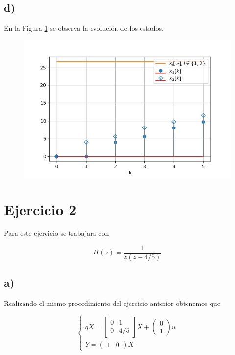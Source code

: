 \documentclass[11pt,a4paper]{article}
\newcommand{\siseq}[1]{ \left\{ \begin{array}{c}
    #1
\end{array} \right. }
\begin{document}
    \subsection*{d)}

    En la Figura \ref{fig:1-d} se observa la evolución de los estados.

    \begin{figure}
        \centering
        \includegraphics[width=.5\textwidth]{Img/1-d.jpg}
        \caption{}
        \label{fig:1-d}
    \end{figure}


    \section*{Ejercicio 2}

    Para este ejercicio se trabajara con 

    \begin{equation}
        H(z) = \frac{1}{z(z-4/5)}
    \end{equation}

    \subsection*{a)}

    Realizando el mismo procedimiento del ejercicio anterior obtenemos que 

    \begin{equation}
        \siseq{
            qX = 
            \begin{bmatrix}
                0 & 1 \\ 
                0 & 4/5
            \end{bmatrix} X
            +
            \begin{pmatrix}
                0 \\ 1
            \end{pmatrix}u \\ 
            Y = 
            \begin{pmatrix}
                1 & 0    
            \end{pmatrix} X
        }
    \end{equation}
\end{document}
